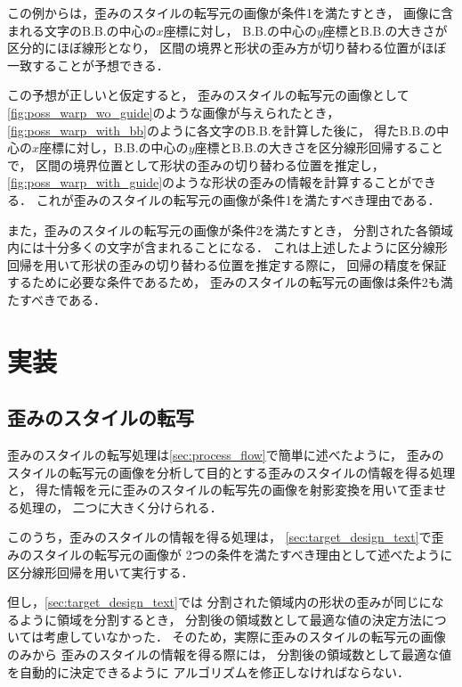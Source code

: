 \documentclass[\homedir/main.tex]{subfiles}
\begin{document}
この例からは，歪みのスタイルの転写元の画像が条件1を満たすとき，
画像に含まれる文字のB.B.の中心の$x$座標に対し，
B.B.の中心の$y$座標とB.B.の大きさが区分的にほぼ線形となり，
区間の境界と形状の歪み方が切り替わる位置がほぼ一致することが予想できる．

この予想が正しいと仮定すると，
歪みのスタイルの転写元の画像として\cref{fig:poss_warp_wo_guide}のような画像が与えられたとき，
\cref{fig:poss_warp_with_bb}のように各文字のB.B.を計算した後に，
得たB.B.の中心の$x$座標に対し，B.B.の中心の$y$座標とB.B.の大きさを区分線形回帰することで，
区間の境界位置として形状の歪みの切り替わる位置を推定し，
\cref{fig:poss_warp_with_guide}のような形状の歪みの情報を計算することができる．
これが歪みのスタイルの転写元の画像が条件1を満たすべき理由である．

また，歪みのスタイルの転写元の画像が条件2を満たすとき，
分割された各領域内には十分多くの文字が含まれることになる．
これは上述したように区分線形回帰を用いて形状の歪みの切り替わる位置を推定する際に，
回帰の精度を保証するために必要な条件であるため，
歪みのスタイルの転写元の画像は条件2も満たすべきである．

\section{実装}\label{sec:implementation}
\subsection{歪みのスタイルの転写}\label{sec:warp_style_transfer}
歪みのスタイルの転写処理は\cref{sec:process_flow}で簡単に述べたように，
歪みのスタイルの転写元の画像を分析して目的とする歪みのスタイルの情報を得る処理と，
得た情報を元に歪みのスタイルの転写先の画像を射影変換を用いて歪ませる処理の，
二つに大きく分けられる．

このうち，歪みのスタイルの情報を得る処理は，
\cref{sec:target_design_text}で歪みのスタイルの転写元の画像が
2つの条件を満たすべき理由として述べたように区分線形回帰を用いて実行する．

但し，\cref{sec:target_design_text}では
分割された領域内の形状の歪みが同じになるように領域を分割するとき，
分割後の領域数として最適な値の決定方法については考慮していなかった．
そのため，実際に歪みのスタイルの転写元の画像のみから
歪みのスタイルの情報を得る際には，
分割後の領域数として最適な値を自動的に決定できるように
アルゴリズムを修正しなければならない．
\end{document}
